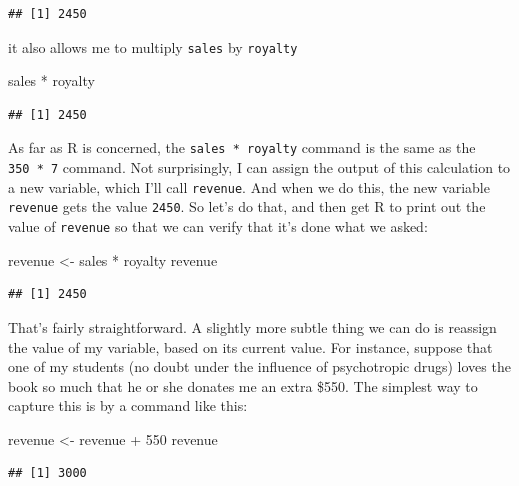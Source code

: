 \documentclass[
]{book}
\newenvironment{Shaded}{\begin{snugshade}}{\end{snugshade}}
\newcommand{\DecValTok}[1]{\textcolor[rgb]{0.00,0.00,0.81}{#1}}
\newcommand{\NormalTok}[1]{#1}
\newcommand{\OtherTok}[1]{\textcolor[rgb]{0.56,0.35,0.01}{#1}}
\newcommand{\SpecialCharTok}[1]{\textcolor[rgb]{0.00,0.00,0.00}{#1}}
\begin{document}
\begin{verbatim}
## [1] 2450
\end{verbatim}

it also allows me to multiply \texttt{sales} by \texttt{royalty}

\begin{Shaded}
\begin{Highlighting}[]
\NormalTok{sales }\SpecialCharTok{*}\NormalTok{ royalty}
\end{Highlighting}
\end{Shaded}

\begin{verbatim}
## [1] 2450
\end{verbatim}

As far as R is concerned, the \texttt{sales\ *\ royalty} command is the same as the \texttt{350\ *\ 7} command. Not surprisingly, I can assign the output of this calculation to a new variable, which I'll call \texttt{revenue}. And when we do this, the new variable \texttt{revenue} gets the value \texttt{2450}. So let's do that, and then get R to print out the value of \texttt{revenue} so that we can verify that it's done what we asked:

\begin{Shaded}
\begin{Highlighting}[]
\NormalTok{revenue }\OtherTok{\textless{}{-}}\NormalTok{ sales }\SpecialCharTok{*}\NormalTok{ royalty}
\NormalTok{revenue}
\end{Highlighting}
\end{Shaded}

\begin{verbatim}
## [1] 2450
\end{verbatim}

That's fairly straightforward. A slightly more subtle thing we can do is reassign the value of my variable, based on its current value. For instance, suppose that one of my students (no doubt under the influence of psychotropic drugs) loves the book so much that he or she donates me an extra \$550. The simplest way to capture this is by a command like this:

\begin{Shaded}
\begin{Highlighting}[]
\NormalTok{revenue }\OtherTok{\textless{}{-}}\NormalTok{ revenue }\SpecialCharTok{+} \DecValTok{550}
\NormalTok{revenue}
\end{Highlighting}
\end{Shaded}

\begin{verbatim}
## [1] 3000
\end{verbatim}
\end{document}
